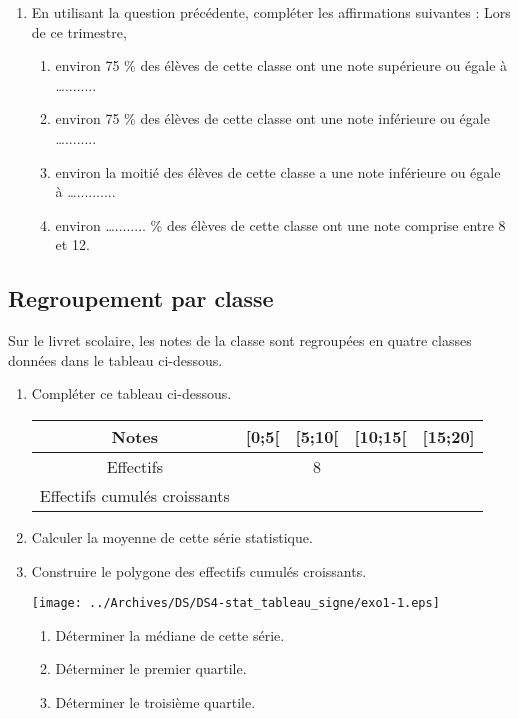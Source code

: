 \begin{enumerate}
\item   En utilisant la question précédente, compléter les affirmations suivantes : Lors de ce trimestre,
\begin{enumerate}
\item  environ 75 \% des élèves de cette classe ont une note supérieure ou égale à …........ 
\item  environ 75 \% des élèves de cette classe ont une note inférieure ou égale …........  
\item  environ la moitié des élèves de cette classe a une note inférieure ou égale à ….......... 
\item  environ …........ \% des élèves de cette classe ont une note comprise entre 8 et 12. 
\end{enumerate}


\end{enumerate}


\subsection*{Regroupement par classe }

Sur le livret scolaire, les notes de la classe sont regroupées en quatre classes données dans le tableau ci-dessous.
 
\begin{enumerate}

\item   Compléter ce tableau ci-dessous.  

\begin{tabular}{|c|c|c|c|c|}
\hline 
Notes & [0;5[ & [5;10[ & [10;15[ & [15;20] \rule[-7pt]{0pt}{20pt} \\ 
\hline 
Effectifs &  & 8 &  &  \rule[-7pt]{0pt}{20pt}  \\ 
\hline 
Effectifs cumulés croissants &  &  &  &  \rule[-7pt]{0pt}{20pt}  \\ 
\hline 
\end{tabular} 

\item  Calculer la moyenne de cette série  statistique. 
\item  Construire le polygone des effectifs cumulés croissants. 

\texttt{[image: ../Archives/DS/DS4-stat\_tableau\_signe/exo1-1.eps]} 
\begin{enumerate}

\item  Déterminer la médiane de cette série. 
\item  Déterminer le premier quartile.  
\item  Déterminer le troisième quartile. 
\end{enumerate}
\end{enumerate}